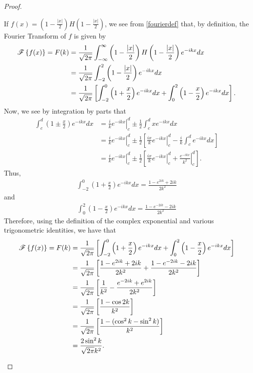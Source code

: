 \begin{proof}
\begin{enumerate}
      If $\displaystyle f(x) = \left(1 - \frac{|x|}{2}\right)H\left(1 - \frac{|x|}{2}\right)$, we see from \eqref{fourierdef}
      that, by definition, the Fourier Transform of $f$ is given by
      \begin{align*}
        \mathscr{F}\left\{ {f(x)} \right\} = F(k)
        &= \frac{1}{\sqrt{2\pi}}\int_{-\infty}^\infty\left(1 - \frac{|x|}{2}\right)H\left(1 - \frac{|x|}{2}\right) e^{-ikx} dx \\
        &= \frac{1}{\sqrt{2\pi}}\int_{-2}^2\left(1 - \frac{|x|}{2}\right)e^{-ikx} dx \\
        &= \frac{1}{\sqrt{2\pi}}\left[\int_{-2}^0 \left(1 + \frac{x}{2}\right) e^{-ikx}dx + \int_{0}^2 \left(1 - \frac{x}{2}\right)e^{-ikx} dx\right].
      \end{align*}
      Now, we see by integration by parts that
      \begin{align*}
        \int_c^d \left(1 \pm \frac{x}{2}\right) e^{-ikx}dx
        &= \left.\frac{i}{k}e^{-ikx}\right\rvert_c^d \pm \frac{1}{2}\int_c^d x e^{-ikx}dx \\
        &= \left.\frac{i}{k}e^{-ikx}\right\rvert_c^d \pm \frac{1}{2}\left[\left.\frac{ix}{k}e^{-ikx} \right\rvert_c^d - \frac{i}{k}\int_c^d e^{-ikx}dx\right] \\
        &= \left.\frac{i}{k}e^{-ikx}\right\rvert_c^d \pm \frac{1}{2}\left[\left.\frac{ix}{k}e^{-ikx} \right\rvert_c^d + \left.\frac{e^{-ikx}}{k^2} \right\rvert_c^d\right].
      \end{align*}
      Thus,
      \begin{align*}
        \int_{-2}^0 \left(1 + \frac{x}{2}\right) e^{-ikx}dx = \frac{1-e^{2ik}+2ik}{2k^2}
      \end{align*}
      and
      \begin{align*}
        \int_{0}^2 \left(1 - \frac{x}{2}\right) e^{-ikx}dx = \frac{1-e^{-2ik}-2ik}{2k^2}
      \end{align*}
      Therefore, using the definition of the complex exponential
      and various trigonometric identities, we have that
      \begin{align*}
        \mathscr{F}\left\{ {f(x)} \right\} = F(k)
        &= \frac{1}{\sqrt{2\pi}}\left[\int_{-2}^0 \left(1 + \frac{x}{2}\right) e^{-ikx}dx + \int_{0}^2 \left(1 - \frac{x}{2}\right)e^{-ikx} dx\right] \\
        &= \frac{1}{\sqrt{2\pi}}\left[\frac{1-e^{2ik}+2ik}{2k^2} + \frac{1-e^{-2ik}-2ik}{2k^2} \right] \\
        &= \frac{1}{\sqrt{2\pi}}\left[\frac{1}{k^2} - \frac{e^{-2ik}+e^{2ik}}{2k^2} \right]\\
        &= \frac{1}{\sqrt{2\pi}}\left[\frac{1-\cos 2k}{k^2}\right] \\
        &= \frac{1}{\sqrt{2\pi}}\left[\frac{1-(\cos^2 k - \sin^2 k)}{k^2}\right] \\
        &= \frac{2\sin^2 k}{\sqrt{2\pi} k^2}.
       \end{align*}
  \end{enumerate}
\end{proof}
\newpage
